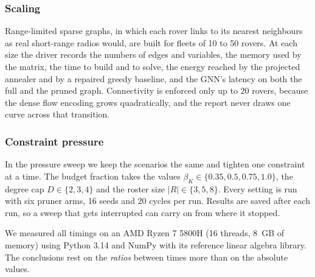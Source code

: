\subsubsection{Scaling} Range-limited sparse graphs, in which each rover
links to its nearest neighbours as real short-range radios would, are built
for fleets of 10 to 50 rovers. At each size the driver records the numbers of
edges and variables, the memory used by the matrix, the time to build and to
solve, the energy reached by the projected annealer and by a repaired greedy
baseline, and the GNN's latency on both the full and the pruned graph. Connectivity is enforced only up to 20 rovers,
because the dense flow encoding grows quadratically, and the report never
draws one curve across that transition.

\subsubsection{Constraint pressure} In the pressure sweep we keep the
scenarios the same and tighten one constraint at a time. The budget fraction
takes the values $\beta_K\in\{0.35,0.5,0.75,1.0\}$, the degree cap
$D\in\{2,3,4\}$ and the roster size $|R|\in\{3,5,8\}$. Every setting is run
with six pruner arms, 16 seeds and 20 cycles per run. Results are saved after
each run, so a sweep that gets interrupted can carry on from where it
stopped.

We measured all timings on an AMD Ryzen 7 5800H (16 threads, 8~GB of memory)
using Python 3.14 and NumPy with its reference linear algebra library. The
conclusions rest on the \emph{ratios} between times more than on the absolute
values.
